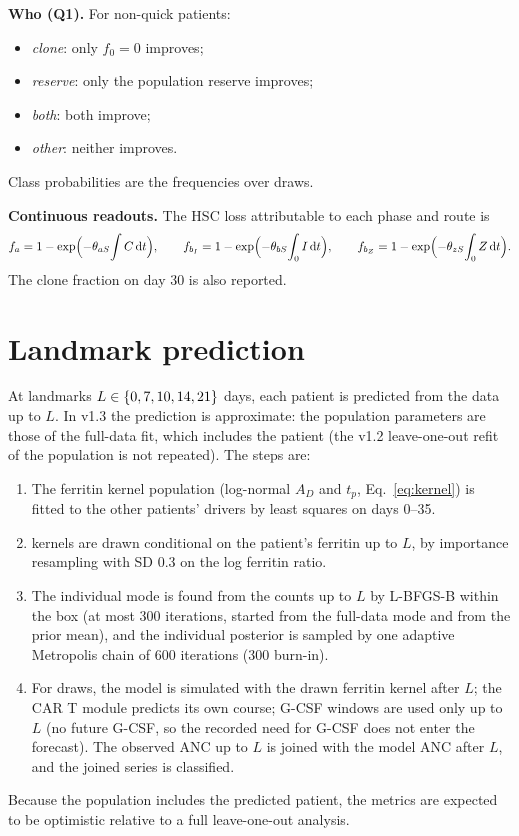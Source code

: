 \documentclass[11pt]{article}
\newcommand{\dd}{\mathrm{d}}
\begin{document}
\textbf{Who (Q1).} For non-quick patients:
\begin{itemize}
\item \emph{clone}: only $f_0=0$ improves;
\item \emph{reserve}: only the population reserve improves;
\item \emph{both}: both improve;
\item \emph{other}: neither improves.
\end{itemize}
Class probabilities are the frequencies over draws.

\textbf{Continuous readouts.} The HSC loss attributable to each phase and route is
\begin{equation}
f_a = 1-\exp\Bigl(-\theta_{aS}\!\int C\,\dd t\Bigr),\qquad f_{b_I} = 1-\exp\Bigl(-\theta_{bS}\!\int_0 I\,\dd t\Bigr),\qquad f_{b_Z} = 1-\exp\Bigl(-\theta_{zS}\!\int_0 Z\,\dd t\Bigr).
\end{equation}
The clone fraction on day 30 is also reported.

\section{Landmark prediction}\label{sec:landmark}
At landmarks $L\in\{0, 7, 10, 14, 21\}$ days, each patient is predicted from the data up to $L$. In v1.3 the prediction is approximate: the population parameters are those of the full-data fit, which includes the patient (the v1.2 leave-one-out refit of the population is not repeated). The steps are:
\begin{enumerate}
\item The ferritin kernel population (log-normal $A_D$ and $t_p$, Eq.~\ref{eq:kernel}) is fitted to the other patients' drivers by least squares on days 0--35.
\item \valFKernel{} kernels are drawn conditional on the patient's ferritin up to $L$, by importance resampling with SD 0.3 on the log ferritin ratio.
\item The individual mode is found from the counts up to $L$ by L-BFGS-B within the box (at most 300 iterations, started from the full-data mode and from the prior mean), and the individual posterior is sampled by one adaptive Metropolis chain of 600 iterations (300 burn-in).
\item For \valFDraws{} draws, the model is simulated with the drawn ferritin kernel after $L$; the CAR T module predicts its own course; G-CSF windows are used only up to $L$ (no future G-CSF, so the recorded need for G-CSF does not enter the forecast). The observed ANC up to $L$ is joined with the model ANC after $L$, and the joined series is classified.
\end{enumerate}
Because the population includes the predicted patient, the metrics are expected to be optimistic relative to a full leave-one-out analysis.
\end{document}
